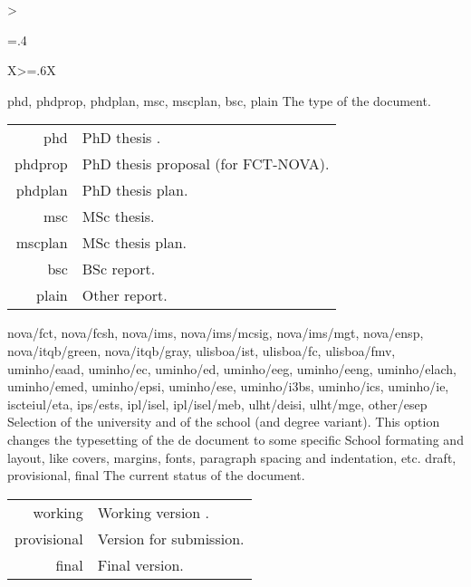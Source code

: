 \bgroup
\begin{xltabular}{\linewidth}{>{\hsize=.4\hsize\raggedright\arraybackslash}X>{\hsize=.6\hsize}X}
  \toprule
  {phd, phdprop, phdplan, msc, mscplan, bsc, plain}%
  {The type of the document.}%
  {%
    \begin{tabular}{@{}r@{ $\rightarrow$ }l@{}}
      phd     & PhD thesis .              \\
      phdprop & PhD thesis proposal (for FCT-NOVA). \\
      phdplan & PhD thesis plan.                    \\
      msc     & MSc thesis.                         \\
      mscplan & MSc thesis plan.                    \\
      bsc     & BSc report.                         \\
      plain   & Other report.                       \\
    \end{tabular}
  }
  \midrule
  {nova/fct, nova/fcsh, nova/ims, nova/ims/mcsig, nova/ims/mgt, nova/ensp, nova/itqb/green, nova/itqb/gray,
    ulisboa/ist, ulisboa/fc, ulisboa/fmv,
    uminho/eaad, uminho/ec, uminho/ed, uminho/eeg, uminho/eeng, uminho/elach, uminho/emed, uminho/epsi, uminho/ese, uminho/i3bs, uminho/ics, uminho/ie,
    iscteiul/eta,
    ips/ests,
    ipl/isel, ipl/isel/meb,
    ulht/deisi, ulht/mge,
    other/esep
  }%
  {Selection of the university and of the school (and degree variant).}%
  {
    This option changes the typesetting of the de document to some specific School formating and layout, like covers, margins, fonts, paragraph spacing and indentation, etc.}
  \midrule
  {draft, provisional, final}%
  {The current status of the document.}%
  {%
    \begin{tabular}{@{}r@{ $\rightarrow$ }X@{}}
      working     & Working version . \\
      provisional & Version for submission.     \\
      final       & Final version.              \\
    \end{tabular}
  }

\end{xltabular}
